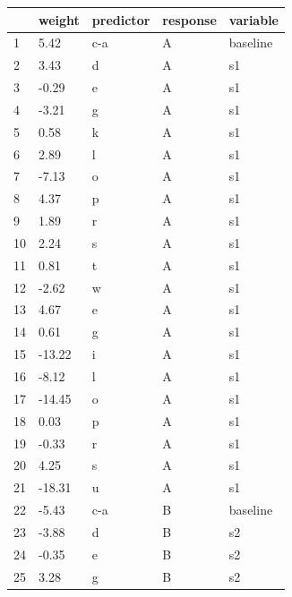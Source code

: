 \begin{table}%
    \centering
    \small
\renewcommand{\arraystretch}{0.90}%
  \begin{tabular}{lllll}
    \lsptoprule
       & weight & predictor & response & variable \\
    \midrule
    1  & 5.42   & c-a       & A        & baseline \\
    2  & 3.43   & d         & A        & s1       \\
    3  & -0.29  & e         & A        & s1       \\
    4  & -3.21  & g         & A        & s1       \\
    5  & 0.58   & k         & A        & s1       \\
    6  & 2.89   & l         & A        & s1       \\
    7  & -7.13  & o         & A        & s1       \\
    8  & 4.37   & p         & A        & s1       \\
    9  & 1.89   & r         & A        & s1       \\
    10 & 2.24   & s         & A        & s1       \\
    11 & 0.81   & t         & A        & s1       \\
    12 & -2.62  & w         & A        & s1       \\
    13 & 4.67   & e         & A        & s1       \\
    14 & 0.61   & g         & A        & s1       \\
    15 & -13.22 & i         & A        & s1       \\
    16 & -8.12  & l         & A        & s1       \\
    17 & -14.45 & o         & A        & s1       \\
    18 & 0.03   & p         & A        & s1       \\
    19 & -0.33  & r         & A        & s1       \\
    20 & 4.25   & s         & A        & s1       \\
    21 & -18.31 & u         & A        & s1       \\
    22 & -5.43  & c-a       & B        & baseline \\
    23 & -3.88  & d         & B        & s2       \\
    24 & -0.35  & e         & B        & s2       \\
    25 & 3.28   & g         & B        & s2       \\

\end{tabular}
\end{table}
